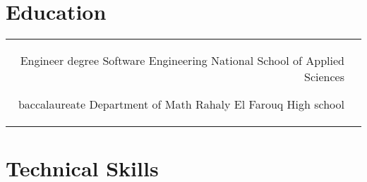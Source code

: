 \documentclass[10pt]{article} %
\begin{document}
\begin{paracol}{2}

\section{Education} 





\begin{supertabular}{rl} %

	
	
	{Engineer degree} %
	{Software Engineering} %
	{National School of Applied Sciences} %
	
	
	{baccalaureate} %
	{} %
	{Department of Math} %
	{Rahaly El Farouq High school} %
	

\end{supertabular}



\section{Technical Skills} 




\end{paracol}
\end{document}
